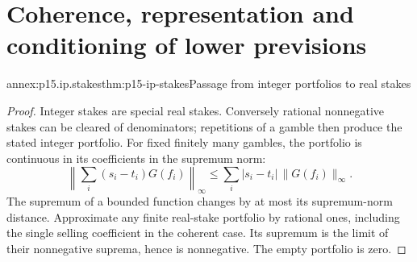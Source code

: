 \section{Coherence, representation and conditioning of lower previsions}
\label{sec:annex-p15-imprecise-probability}

\begin{annexitem}{annex:p15.ip.stakes}{thm:p15-ip-stakes}{Passage from integer portfolios to real stakes}
\begin{proof}
Integer stakes are special real stakes. Conversely rational nonnegative
stakes can be cleared of denominators; repetitions of a gamble then
produce the stated integer portfolio. For fixed finitely many gambles,
the portfolio is continuous in its coefficients in the supremum norm:
\[
 \left\|\sum_i(s_i-t_i)G(f_i)\right\|_\infty
       \leq\sum_i|s_i-t_i|\,\|G(f_i)\|_\infty.
\]
The supremum of a bounded function changes by at most its supremum-norm
distance. Approximate any finite real-stake portfolio by rational ones,
including the single selling coefficient in the coherent case.
Its supremum is the limit of their nonnegative suprema, hence is
nonnegative. The empty portfolio is zero.
\end{proof}
\end{annexitem}

